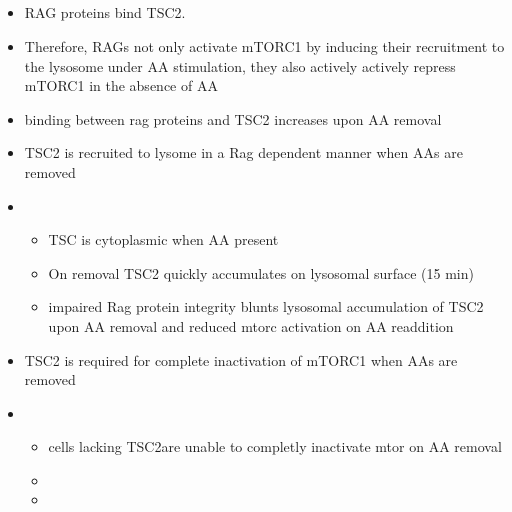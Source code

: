 \documentclass{article}
\begin{document}
    \subsection{\cite{demetriades2014regulation}}
    \begin{itemize}
        \item RAG proteins bind TSC2.
        \item Therefore, RAGs not only activate mTORC1 by inducing their recruitment to the lysosome under AA stimulation, they also actively actively repress mTORC1 in the absence of AA
        \item binding between rag proteins and TSC2 increases upon AA removal
        \item TSC2 is recruited to lysome in a Rag dependent manner when AAs are removed
        \item \begin{itemize}
                  \item TSC is cytoplasmic when AA present
                  \item On removal TSC2 quickly accumulates on lysosomal surface (15 min)
                  \item impaired Rag protein integrity blunts lysosomal accumulation of TSC2 upon AA removal and reduced mtorc activation on AA readdition
        \end{itemize}
        \item TSC2 is required for complete inactivation of mTORC1 when AAs are removed
        \item \begin{itemize}
                  \item cells lacking TSC2are unable to completly inactivate mtor on AA removal
                  \item
                  \item
        \end{itemize}
    \end{itemize}







    
    
\end{document}
